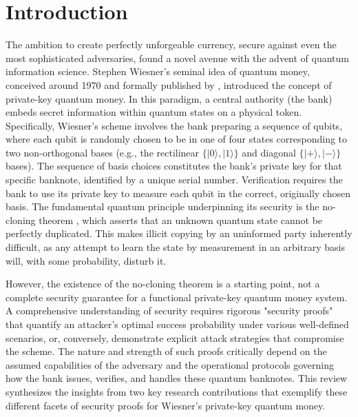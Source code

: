 \documentclass{article} %
\begin{document}
\section{Introduction}
The ambition to create perfectly unforgeable currency, secure against even the most sophisticated adversaries, found a novel avenue with the advent of quantum information science. Stephen Wiesner's seminal idea of quantum money, conceived around 1970 and formally published by \citet{Wiesner1983Conjugate}, introduced the concept of private-key quantum money. In this paradigm, a central authority (the bank) embeds secret information within quantum states on a physical token. Specifically, Wiesner's scheme involves the bank preparing a sequence of qubits, where each qubit is randomly chosen to be in one of four states corresponding to two non-orthogonal bases (e.g., the rectilinear $\{|0\rangle, |1\rangle\}$ and diagonal $\{|+\rangle, |-\rangle\}$ bases). The sequence of basis choices constitutes the bank's private key for that specific banknote, identified by a unique serial number. Verification requires the bank to use its private key to measure each qubit in the correct, originally chosen basis. The fundamental quantum principle underpinning its security is the no-cloning theorem \citep{WoottersZurek1982Single}, which asserts that an unknown quantum state cannot be perfectly duplicated. This makes illicit copying by an uninformed party inherently difficult, as any attempt to learn the state by measurement in an arbitrary basis will, with some probability, disturb it.

However, the existence of the no-cloning theorem is a starting point, not a complete security guarantee for a functional private-key quantum money system. A comprehensive understanding of security requires rigorous "security proofs" that quantify an attacker's optimal success probability under various well-defined scenarios, or, conversely, demonstrate explicit attack strategies that compromise the scheme. The nature and strength of such proofs critically depend on the assumed capabilities of the adversary and the operational protocols governing how the bank issues, verifies, and handles these quantum banknotes. This review synthesizes the insights from two key research contributions that exemplify these different facets of security proofs for Wiesner's private-key quantum money.
\end{document}
